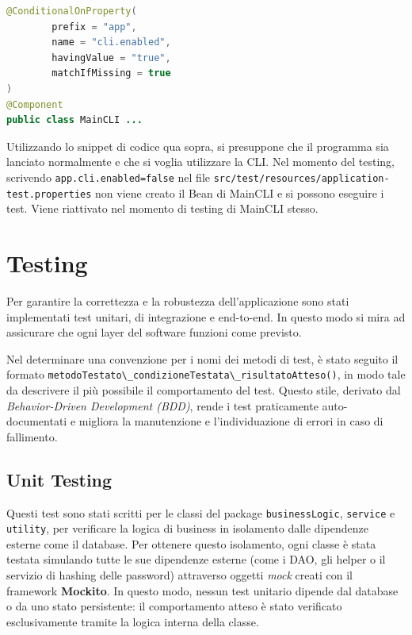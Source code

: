 \documentclass[
  italian,
  paper=a4,
  ,captions=tableheading
]{scrbook}
\newcommand{\passthrough}[1]{#1}
\begin{document}
\begin{lstlisting}[language=Java, language=Java, caption={Snipper per @ConditionalOnProperty.}, label={lst:conditional-annotation}, label=lst:conditional-annotation]
@ConditionalOnProperty(
        prefix = "app",
        name = "cli.enabled",
        havingValue = "true",
        matchIfMissing = true 
)
@Component
public class MainCLI ...
\end{lstlisting}

Utilizzando lo snippet di codice qua sopra, si presuppone che il
programma sia lanciato normalmente e che si voglia utilizzare la CLI.
Nel momento del testing, scrivendo
\passthrough{\lstinline!app.cli.enabled=false!} nel file
\passthrough{\lstinline!src/test/resources/application-test.properties!}
non viene creato il Bean di MainCLI e si possono eseguire i test. Viene
riattivato nel momento di testing di MainCLI stesso.

\chapter{Testing}\label{testing}

Per garantire la correttezza e la robustezza dell'applicazione sono
stati implementati test unitari, di integrazione e end-to-end. In questo
modo si mira ad assicurare che ogni layer del software funzioni come
previsto.

Nel determinare una convenzione per i nomi dei metodi di test, è stato
seguito il formato
\passthrough{\lstinline!metodoTestato\_condizioneTestata\_risultatoAtteso()!},
in modo tale da descrivere il più possibile il comportamento del test.
Questo stile, derivato dal \emph{Behavior-Driven Development (BDD)},
rende i test praticamente auto-documentati e migliora la manutenzione e
l'individuazione di errori in caso di fallimento.

\section{Unit Testing}\label{unit-testing}

Questi test sono stati scritti per le classi del package
\passthrough{\lstinline!businessLogic!},
\passthrough{\lstinline!service!} e \passthrough{\lstinline!utility!},
per verificare la logica di business in isolamento dalle dipendenze
esterne come il database. Per ottenere questo isolamento, ogni classe è
stata testata simulando tutte le sue dipendenze esterne (come i DAO, gli
helper o il servizio di hashing delle password) attraverso oggetti
\emph{mock} creati con il framework \textbf{Mockito}. In questo modo,
nessun test unitario dipende dal database o da uno stato persistente: il
comportamento atteso è stato verificato esclusivamente tramite la logica
interna della classe.
\end{document}
